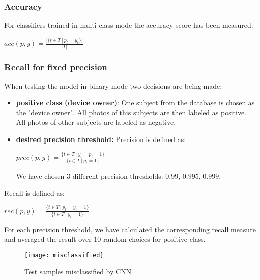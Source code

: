         \subsubsection*{Accuracy}
        For classifiers trained in multi-class mode the accuracy score has been
        measured:

        \begin{center}
        $acc(p, y) = \frac{|\{t \in T\ |\ p_t = y_t\}|}{|T|}$
        \end{center}

        \subsubsection*{Recall for fixed precision}

        When testing the model in binary mode two decisions are being made:
        \begin{itemize}
            \item \textbf{positive class (device owner)}: One subject from the
            database is chosen as the "device owner". All photos of this subjects
            are then labeled as positive. All photos of other subjects are
            labeled as negative.
            \item \textbf{desired precision threshold:}
            Precision is defined as:
            \begin{center}
            $prec(p, y) = \frac{\{t \in T\ |\ y_t = p_t = 1\}}{\{t \in T\ |\ p_t = 1\}}$
            \end{center}
            We have chosen $3$ different precision thresholds: $0.99$, $0.995$, $0.999$.
        \end{itemize}
        Recall is defined as:
        \begin{center}
        $rec(p, y) = \frac{\{t \in T\ |\ p_t = y_t = 1\}}{\{t \in T\ |\ y_t = 1\}}$
        \end{center}
        For each precision threshold, we have calculated the corresponding recall measure and
        averaged the result over $10$ random choices for positive class.

    \begin{figure}[H]
    \caption{Test samples misclassified by CNN}
    \centering
    \texttt{[image: misclassified]}
    \end{figure}


